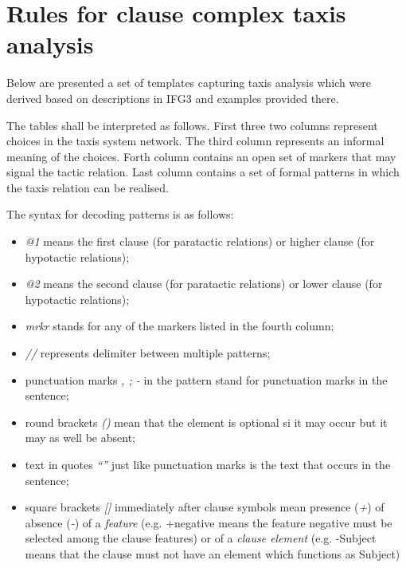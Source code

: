 \chapter{Rules for clause complex taxis analysis}
\label{ch:texis-patterns}
Below are presented a set of templates capturing taxis analysis which were derived based on descriptions in IFG3 \citep{Halliday2004} and examples provided there. 

The tables shall be interpreted as follows. First three two columns represent choices in the taxis system network. The third column represents an informal meaning of the choices. Forth column contains an open set of markers that may signal the tactic relation. Last column contains a set of formal patterns in which the taxis relation can be realised. 

The syntax for decoding patterns is as follows: 
\begin{itemize}
	\item \textit{@1} means the first clause (for paratactic relations) or higher clause (for hypotactic relations); 
	\item \textit{@2} means the second clause (for paratactic relations) or lower clause (for hypotactic relations); 
	\item \textit{mrkr} stands for any of the markers listed in the fourth column;
	\item \textit{//} represents delimiter between multiple patterns;
	\item punctuation marks \textit{, ; -} in the pattern stand for punctuation marks in the sentence;
	\item round brackets \textit{()} mean that the element is optional si it may occur but it may as well be absent;
	\item text in quotes \textit{``''} just like punctuation marks is the text that occurs in the sentence;
	\item square brackets \textit{[]} immediately after clause symbols mean presence (\textit{+}) of absence (\textit{-}) of a \textit{feature} (e.g. +negative means the feature negative must be selected among the clause features) or of a \textit{clause element} (e.g. -Subject means that the clause must not have an element which functions as Subject)
\end{itemize}

